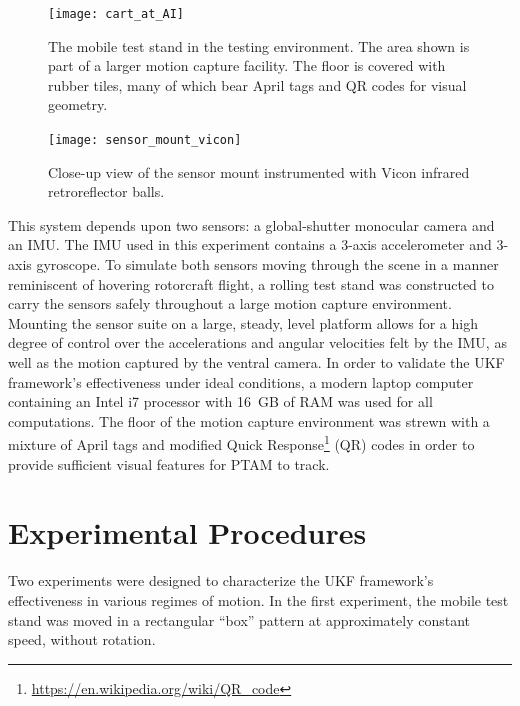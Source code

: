 \begin{figure}
  \centering
    \texttt{[image: cart\_at\_AI]}
  \caption[Testing Environment]{The mobile test stand in the testing environment. The area shown is part of a larger motion capture facility. The floor is covered with rubber tiles, many of which bear April tags and QR codes for visual geometry.}
  \label{fig:cart_at_AI}
\end{figure}

\begin{figure}
  \centering
    \texttt{[image: sensor\_mount\_vicon]}
  \caption[Sensor Mount Instrumented with Vicon Retroreflectors]{Close-up view of the sensor mount instrumented with Vicon infrared retroreflector balls.}
  \label{fig:sensor_mount_vicon}
\end{figure}

This system depends upon two sensors: a global-shutter monocular camera and an IMU. The IMU used in this experiment contains a 3-axis accelerometer and 3-axis gyroscope. To simulate both sensors moving through the scene in a manner reminiscent of hovering rotorcraft flight, a rolling test stand was constructed to carry the sensors safely throughout a large motion capture environment. Mounting the sensor suite on a large, steady, level platform allows for a high degree of control over the accelerations and angular velocities felt by the IMU, as well as the motion captured by the ventral camera. In order to validate the UKF framework's effectiveness under ideal conditions, a modern laptop computer containing an Intel i7 processor with 16~GB of RAM was used for all computations. The floor of the motion capture environment was strewn with a mixture of April tags and modified Quick Response\footnote{\url{https://en.wikipedia.org/wiki/QR_code}} (QR) codes in order to provide sufficient visual features for PTAM to track.

\section{Experimental Procedures}

Two experiments were designed to characterize the UKF framework's effectiveness in various regimes of motion. In the first experiment, the mobile test stand was moved in a rectangular ``box'' pattern at approximately constant speed, without rotation.

